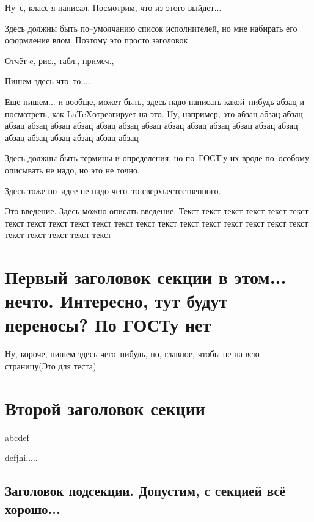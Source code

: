 \documentclass{article}
\begin{document}
{\Huge
Ну--с, класс я написал. Посмотрим, что из этого выйдет...

}


\Executors

Здесь должны быть по--умолчанию список исполнителей, но мне набирать его оформление влом. Поэтому это просто заголовок

\Repherat

Отчёт \totalpages{} c, \totalfigures{} рис., \totaltables{} табл., \totalappendix{} примеч.,


Пишем здесь что--то....

Еще пишем... и вообще, может быть, здесь надо написать какой--нибудь абзац и посмотреть, как \LaTeX отреагирует на это. Ну, например, это абзац  абзац абзац абзац абзац абзац абзац абзац абзац абзац абзац абзац абзац абзац абзац абзац абзац абзац абзац абзац абзац абзац

\newpage

\tableofcontents

\TermAndDefine

Здесь должны быть термины и определения, но по--ГОСТ'у их вроде по--особому описывать не надо, но это не точно.

\listAbbreviationAndNotation

Здесь тоже по--идее не надо чего--то сверхъестественного.

\Intoduction

Это введение. Здесь можно описать введение. Текст текст текст текст текст текст текст текст текст текст текст текст текст текст текст текст текст текст текст текст текст текст текст текст текст

\section{Первый заголовок секции в этом... нечто. Интересно, тут будут переносы? По ГОСТу нет}

Ну, короче, пишем здесь чего--нибудь, но, главное, чтобы не на всю страницу(Это для теста)

\section{Второй заголовок секции}

abcdef 

defjhi.....

\subsection{Заголовок подсекции. Допустим, с секцией всё хорошо...}
\end{document}
